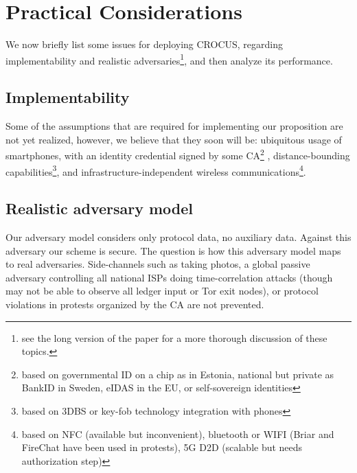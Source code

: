 \section{Practical Considerations}%
\label{Practical}

We now briefly list some issues for deploying
CROCUS, regarding implementability and realistic adversaries\footnote{see the long version of the paper for a more thorough
discussion of these topics. }, and then analyze its performance. 

\subsection{Implementability}

Some of the assumptions that are required for implementing our proposition are 
not yet realized, however, we believe that they soon will be:
ubiquitous usage of smartphones, with an identity credential
signed by some \ac{CA}\footnote{based on \eg governmental ID on a chip as in Estonia, national
  but private as BankID in Sweden, eIDAS in the EU, or self-sovereign
  identities} ,  distance-bounding capabilities\footnote{based on \eg
  3DBS or key-fob technology integration with phones}, and
infrastructure-independent wireless communications\footnote{based on
  \eg NFC (available but inconvenient), bluetooth or WIFI (Briar and
  FireChat have been used in protests), 5G D2D (scalable but needs
  authorization step)}.

\subsection{Realistic adversary model}
Our adversary model considers only protocol data, no auxiliary data.
Against this adversary our scheme is secure.
The question is how this adversary model maps to real
adversaries. Side-channels such as taking photos, a global passive adversary
controlling all national ISPs doing time-correlation attacks (though
may not be able to observe all ledger input or \eg Tor exit nodes), or
protocol violations in protests organized by the \ac{CA} are
not prevented.

